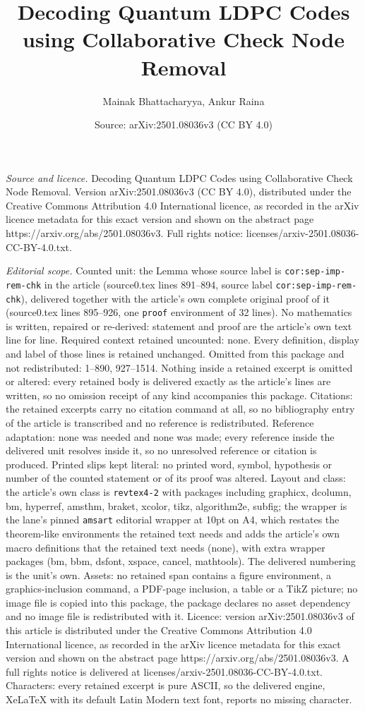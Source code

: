 \documentclass[10pt,a4paper]{amsart}
\title[Decoding Quantum LDPC Codes using Collaborative Check Node R]{Decoding Quantum LDPC Codes using Collaborative Check Node Removal}
\author{Mainak Bhattacharyya, Ankur Raina}
\date{Source: arXiv:2501.08036v3 (CC BY 4.0)}
\begin{document}
\maketitle

\noindent\emph{Source and licence.} Decoding Quantum LDPC Codes using Collaborative Check Node Removal. Version arXiv:2501.08036v3 (CC BY 4.0), distributed under the Creative Commons Attribution 4.0 International licence, as recorded in the arXiv licence metadata for this exact version and shown on the abstract page https://arxiv.org/abs/2501.08036v3. Full rights notice: licenses/arxiv-2501.08036-CC-BY-4.0.txt.\par\smallskip

\noindent\textit{Editorial scope.} Counted unit: the Lemma whose source label is \texttt{cor:sep-imp-rem-chk} in the article (source0.tex lines 891--894, source label \texttt{cor:sep-imp-rem-chk}), delivered together with the article's own complete original proof of it (source0.tex lines 895--926, one \texttt{proof} environment of 32 lines). No mathematics is written, repaired or re-derived: statement and proof are the article's own text line for line. Required context retained uncounted: none. Every definition, display and label of those lines is retained unchanged. Omitted from this package and not redistributed: 1--890, 927--1514. Nothing inside a retained excerpt is omitted or altered: every retained body is delivered exactly as the article's lines are written, so no omission receipt of any kind accompanies this package. Citations: the retained excerpts carry no citation command at all, so no bibliography entry of the article is transcribed and no reference is redistributed. Reference adaptation: none was needed and none was made; every reference inside the delivered unit resolves inside it, so no unresolved reference or citation is produced. Printed slips kept literal: no printed word, symbol, hypothesis or number of the counted statement or of its proof was altered. Layout and class: the article's own class is \texttt{revtex4-2} with packages including graphicx, dcolumn, bm, hyperref, amsthm, braket, xcolor, tikz, algorithm2e, subfig; the wrapper is the lane's pinned \texttt{amsart} editorial wrapper at 10pt on A4, which restates the theorem-like environments the retained text needs and adds the article's own macro definitions that the retained text needs (none), with extra wrapper packages (bm, bbm, dsfont, xspace, cancel, mathtools). The delivered numbering is the unit's own. Assets: no retained span contains a figure environment, a graphics-inclusion command, a PDF-page inclusion, a table or a TikZ picture; no image file is copied into this package, the package declares no asset dependency and no image file is redistributed with it. Licence: version arXiv:2501.08036v3 of this article is distributed under the Creative Commons Attribution 4.0 International licence, as recorded in the arXiv licence metadata for this exact version and shown on the abstract page https://arxiv.org/abs/2501.08036v3. A full rights notice is delivered at licenses/arxiv-2501.08036-CC-BY-4.0.txt. Characters: every retained excerpt is pure ASCII, so the delivered engine, XeLaTeX with its default Latin Modern text font, reports no missing character.
\end{document}
